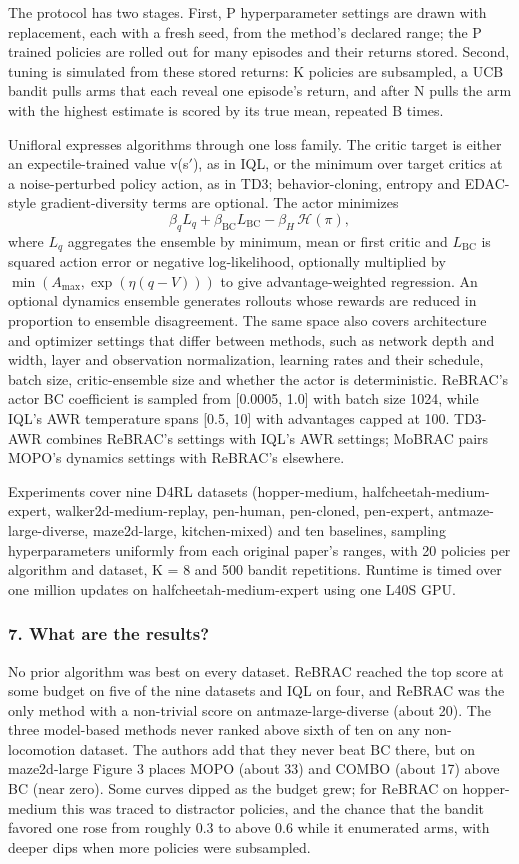 \documentclass[11pt]{article}
\newcommand{\question}[1]{\subsubsection*{#1}}
\begin{document}
The protocol has two stages. First, P hyperparameter settings are drawn with replacement, each with a fresh seed, from the method's declared range; the P trained policies are rolled out for many episodes and their returns stored. Second, tuning is simulated from these stored returns: K policies are subsampled, a UCB bandit pulls arms that each reveal one episode's return, and after N pulls the arm with the highest estimate is scored by its true mean, repeated B times.

Unifloral expresses algorithms through one loss family. The critic target is either an expectile-trained value v(s\ensuremath{'}), as in IQL, or the minimum over target critics at a noise-perturbed policy action, as in TD3; behavior-cloning, entropy and EDAC-style gradient-diversity terms are optional. The actor minimizes \begin{equation*}\beta_q L_q+\beta_{\mathrm{BC}}L_{\mathrm{BC}}-\beta_H\,\mathcal{H}(\pi),\end{equation*} where $L_q$ aggregates the ensemble by minimum, mean or first critic and $L_{\mathrm{BC}}$ is squared action error or negative log-likelihood, optionally multiplied by $\min(A_{\max},\exp(\eta(q-V)))$ to give advantage-weighted regression. An optional dynamics ensemble generates rollouts whose rewards are reduced in proportion to ensemble disagreement. The same space also covers architecture and optimizer settings that differ between methods, such as network depth and width, layer and observation normalization, learning rates and their schedule, batch size, critic-ensemble size and whether the actor is deterministic. ReBRAC's actor BC coefficient is sampled from [0.0005, 1.0] with batch size 1024, while IQL's AWR temperature spans [0.5, 10] with advantages capped at 100. TD3-AWR combines ReBRAC's settings with IQL's AWR settings; MoBRAC pairs MOPO's dynamics settings with ReBRAC's elsewhere.

Experiments cover nine D4RL datasets (hopper-medium, halfcheetah-medium-expert, walker2d-medium-replay, pen-human, pen-cloned, pen-expert, antmaze-large-diverse, maze2d-large, kitchen-mixed) and ten baselines, sampling hyperparameters uniformly from each original paper's ranges, with 20 policies per algorithm and dataset, K = 8 and 500 bandit repetitions. Runtime is timed over one million updates on halfcheetah-medium-expert using one L40S GPU.

\question{7. What are the results?}

No prior algorithm was best on every dataset. ReBRAC reached the top score at some budget on five of the nine datasets and IQL on four, and ReBRAC was the only method with a non-trivial score on antmaze-large-diverse (about 20). The three model-based methods never ranked above sixth of ten on any non-locomotion dataset. The authors add that they never beat BC there, but on maze2d-large Figure 3 places MOPO (about 33) and COMBO (about 17) above BC (near zero). Some curves dipped as the budget grew; for ReBRAC on hopper-medium this was traced to distractor policies, and the chance that the bandit favored one rose from roughly 0.3 to above 0.6 while it enumerated arms, with deeper dips when more policies were subsampled.
\end{document}

